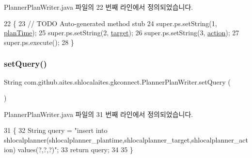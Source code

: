Planner\+Plan\+Writer.\+java 파일의 22 번째 라인에서 정의되었습니다.


\begin{DoxyCode}
22                                                      \{
23         \textcolor{comment}{// TODO Auto-generated method stub}
24         super.ps.setString(1, \mbox{\hyperlink{classcom_1_1github_1_1aites_1_1shlocalaites_1_1gkconnect_1_1_planner_plan_writer_ad6cb43e87aa18f5f2a27f8adb848ba3e}{planTime}});
25         super.ps.setString(2, \mbox{\hyperlink{classcom_1_1github_1_1aites_1_1shlocalaites_1_1gkconnect_1_1_planner_plan_writer_aba8faa2341be4a8571453df2ee7144ab}{target}});
26         super.ps.setString(3, \mbox{\hyperlink{classcom_1_1github_1_1aites_1_1shlocalaites_1_1gkconnect_1_1_planner_plan_writer_ac126c52b58b3cca2aa2189e0a2d42979}{action}});
27         super.ps.execute();
28     \}
\end{DoxyCode}
\mbox{\label{classcom_1_1github_1_1aites_1_1shlocalaites_1_1gkconnect_1_1_planner_plan_writer_a3cf7f937df3c71df97ada4574b4a01f9}} 
\subsubsection{\texorpdfstring{set\+Query()}{setQuery()}}
{\footnotesize\ttfamily String com.\+github.\+aites.\+shlocalaites.\+gkconnect.\+Planner\+Plan\+Writer.\+set\+Query (\begin{DoxyParamCaption}{ }\end{DoxyParamCaption})}



Planner\+Plan\+Writer.\+java 파일의 31 번째 라인에서 정의되었습니다.


\begin{DoxyCode}
31                              \{
32         String query = \textcolor{stringliteral}{"insert into
       shlocalplanner(shlocalplanner\_plantime,shlocalplanner\_target,shlocalplanner\_action) values(?,?,?)"};
33         \textcolor{keywordflow}{return} query;
34     
35     \}
\end{DoxyCode}


